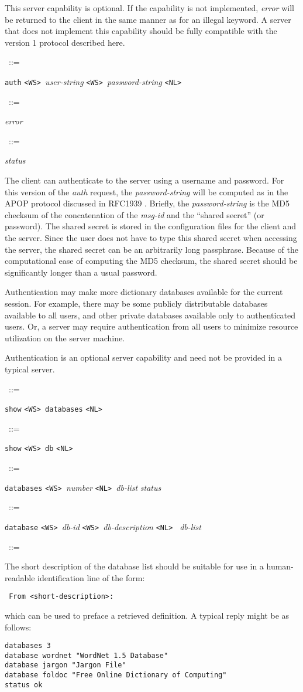 \documentclass{article}
\newcommand{\WS}{\mbox{\tt <WS>\ }}
\newcommand{\NL}{\mbox{\tt <NL>\ }}
\newcommand{\note}{\bigskip\par\noindent}
\newcommand{\prd}[3][]{\noindent\begin{leftline}\hspace{1em}{\it #2}\ ::=\ %
  \begin{minipage}[t]{.64\textwidth}\raggedright #3\end{minipage}%
    \ifthenelse{\equal{#1}{}}{}%
    {\begin{minipage}[t]{.54\textwidth}\raggedright #1\end{minipage}%
      \vspace{1ex}}%
    \end{leftline}}
\newcommand{\lhs}[1]{{\it #1\/}}
\newcommand{\lit}[1]{{\tt #1}}
\begin{document}
This server capability is optional.  If the capability is not implemented,
\lhs{error} will be returned to the client in the same manner as for an
illegal keyword.  A server that does not implement this capability should
be fully compatible with the version 1 protocol described here.\note

\prd{auth}{\lit{auth} \WS \lhs{user-string} \WS \lhs{password-string} \NL}
\prd{auth-response}{\lhs{error}}
\prd{auth-response}{\lhs{status}}

\note The client can authenticate to the server using a username and
password.  For this version of the \lhs{auth} request, the
\lhs{password-string} will be computed as in the APOP protocol discussed in
RFC1939 \cite{RFC1939}.  Briefly, the \lhs{password-string} is the MD5
checksum of the concatenation of the \lhs{msg-id} and the ``shared secret''
(or password).  The shared secret is stored in the configuration files for
the client and the server.  Since the user does not have to type this
shared secret when accessing the server, the shared secret can be an
arbitrarily long passphrase.  Because of the computational ease of
computing the MD5 checksum, the shared secret should be significantly
longer than a usual password.

Authentication may make more dictionary databases available for the current
session.  For example, there may be some publicly distributable databases
available to all users, and other private databases available only to
authenticated users.  Or, a server may require authentication from all
users to minimize resource utilization on the server machine.

Authentication is an optional server capability and need not be
provided in a typical server.\note

\prd{show-db}{\lit{show} \WS \lit{databases} \NL}
\prd{show-db}{\lit{show} \WS \lit{db} \NL}
\prd{show-db-response}{\lit{databases} \WS \lhs{number} \NL \lhs{db-list}
  \lhs{status}}
\prd{db-list}{\lit{database} \WS \lhs{db-id} \WS \lhs{db-description} \NL
              \lhs{db-list}}
\prd{db-list}{}

\note The short description of the database list should be suitable for use
in a human-readable identification line of the form:
\begin{center}\tt
  From <short-description>:
\end{center}
which can be used to preface a retrieved definition.  A typical reply might
be as follows:

\begin{verbatim}
databases 3
database wordnet "WordNet 1.5 Database"
database jargon "Jargon File"
database foldoc "Free Online Dictionary of Computing"
status ok
\end{verbatim}
\end{document}
